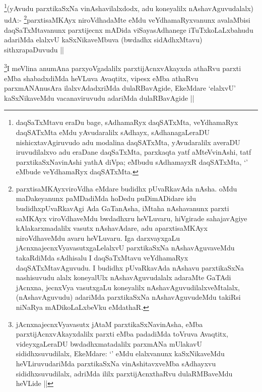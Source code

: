 \begin{artha}
\footnote{daqSaTxMtavu eraDu bage, sAdhamaRyx daqSATxMta, veYdhamaRyx daqSATxMta eMdu yAvudaralilx sAdhayx, sAdhanagaLeraDU nishicxtavAgiruvudo adu modalina daqSATxMta, yAvudaralilx averaDU iruvudilalxvo adu eraDane daqSaTxMta, parxkaqta yatf aMteVvinAshi, tatf parxtikaSxNavinAshi yathA diVpa; eMbudu sAdhamayxR daqSATxMta, `\stext' eMbude veYdhamaRyx daqSATxMta.}(yAvudu parxtikaSxNa vinAshavilalxdodx, adu koneyalilx nAshavAguvudalalx) udA:- \footnote{parxtisaMKAyxviroVdha eMdare budidhx pUvaRkavAda nAsha. oMdu maDakeyanunx paMDadiMda hoDedu puDimADidare idu budidhxpUvaRkavAgi Ada GaTanAsha, iMtaha nAshavanunx parxti saMKAyx viroVdhaveMdu bwdadhxru heVLuvaru, hiVgirade sahajavAgiye kAlakarxmadalilx vasutx nAshavAdare, adu aparxtisaMKAyx niroVdhaveMdu avaru heVLuvaru. Iga darxvayxgaLu jAcnxnajecnxVyavasutxgaLelalxvU parxtikaSxNa nAshavAguvaveMdu takaRdiMda sAdhisalu I daqSaTxMtavu veYdhamaRyx daqSATxMtavAguvudu. I budidhx pUvaRkavAda nAshavu parxtikaSxNa nashisuvudu alalx koneyalUlx nAshavAguvudalalx adaraMte GaTAdi jAcnxna, jecnxVya vasutxgaLu koneyalilx nAshavAguvudilalxveMtalalx, (nAshavAguvudu) adariMda parxtikaSxNa nAshavAguvudeMdu takiRsi niNaRya mADikoLaLxbeVku eMdathaR.}parxtisaMKAyx niroVdhadaMte eMdu veYdhamaRyxvanunx avalaMbisi daqSaTxMtavanunx parxtijecnx mADida viSayasAdhanege iTuTxkoLaLxbahudu adariMda elalxvU kaSxNikaveMbuva (bwdadhx sidAdhxMtavu) sithxrapaDuvudu ||
\end{artha}

\begin{artha}
\footnote{jAcnxnajecnxVyavasutx jAtaM parxtikaSxNavinAsha, eMba parxtijAcnxvAkayxdalilx parxti eMba padadiMda toVruva Avaqtitx, videyxgaLeraDU bwdadhxmatadalilx parxmANa mUlakavU sididhxsuvudilalx, EkeMdare: `\stext' eMdu elalxvanunx kaSxNikaveMdu heVLiruvudariMda parxtikaSxNa vinAshitavxveMba sAdhayxvu sididhxsuvudilalx, adriMda ililx parxtijAcnxthaRvu dulaRMBaveMdu heVLide ||}I meVlina anumAna parxyoVgadalilx parxtijAcnxvAkayxda athaRvu parxti eMba shabadxdiMda heVLuva Avaqtitx, vipesx eMba athaRvu parxmANAnusAra ilalxvAdadxriMda dulaRBavAgide, EkeMdare `elalxvU' kaSxNikaveMdu vacanaviruvudu adariMda dulaRBavAgide ||
\end{artha}

